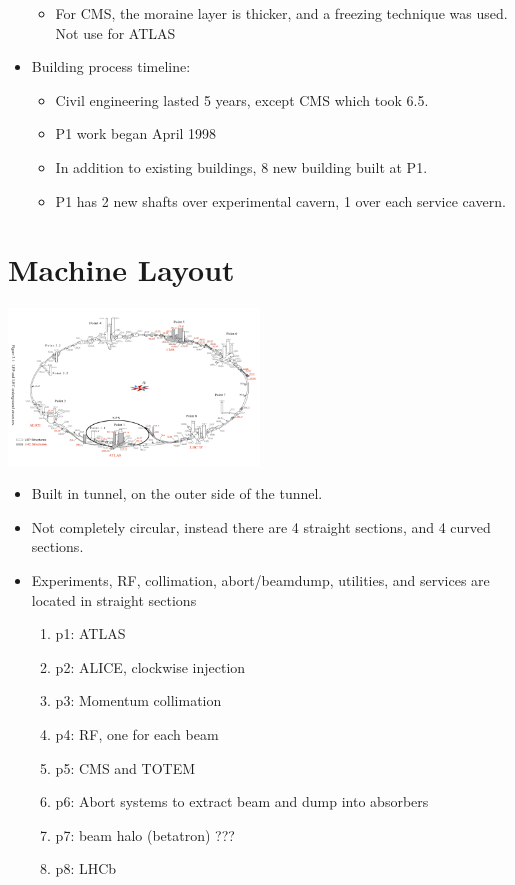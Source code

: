 \begin{itemize}
\begin{itemize}
        \item For CMS, the moraine layer is thicker, and a freezing technique was used. Not use for ATLAS \cite{lhcDesignV2}
    \end{itemize}
    \item Building process timeline:
    \begin{itemize}\scriptsize
        \item Civil engineering lasted 5 years, except CMS which took 6.5. \cite{lhcDesignV2}
        \item P1 work began April 1998 \cite{lhcDesignV2}
        \item In addition to existing buildings, 8 new building built at P1. \cite{lhcDesignV2}
        \item P1 has 2 new shafts over experimental cavern, 1 over each service cavern. \cite{lhcDesignV2}
    \end{itemize}
\end{itemize}

\section{Machine Layout}
\includegraphics[width=0.5\textwidth]{figures/notes-experiment/lhcLepLayout.png}
\begin{itemize}
    \item Built in tunnel, on the outer side of the tunnel.
    \item Not completely circular, instead there are 4 straight sections, and 4 curved sections. \cite{lyndon}
    \item Experiments, RF, collimation, abort/beamdump, utilities, and services are located in straight sections \cite{lyndon}
    \begin{enumerate}\scriptsize
        \item p1: ATLAS
        \item p2: ALICE, clockwise injection
        \item p3: Momentum collimation
        \item p4: RF, one for each beam
        \item p5: CMS and TOTEM
        \item p6: Abort systems to extract beam and dump into absorbers
        \item p7: beam halo (betatron) {\color{blue} ???}
        \item p8: LHCb
    \end{enumerate}
\end{itemize}

